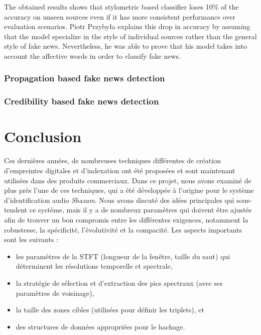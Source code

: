\documentclass[10pt, english]{report}
\begin{document}
The obtained results shows that stylometric based classifier loses 10\% of the accuracy on unseen sources even if it has more consistent performance over evaluation scenarios. Piotr Przybyła explains this drop in accuracy by assuming that the model specialize in the style of individual sources rather than the general style of fake news. Nevertheless, he was able to prove that his model takes into account the affective words in order to classify fake news.
\subsection{Propagation based fake news detection}

\subsection{Credibility based fake news detection}




\chapter{Conclusion}
Ces dernières années, de nombreuses techniques différentes de création d'empreintes digitales et d'indexation ont été proposées et sont maintenant utilisées dans des produits commerciaux. Dans ce projet, nous avons examiné de plus près l'une de ces techniques, qui a été développée à l'origine pour le système d'identification audio \textit{Shazam}. Nous avons discuté des idées principales qui sous-tendent ce système, mais il y a de nombreux paramètres qui doivent être ajustés afin de trouver un bon compromis entre les différentes exigences, notamment la robustesse, la spécificité, l'évolutivité et la compacité. Les aspects importants sont les suivants :\\

 \begin{itemize}
	\item les paramètres de la STFT (longueur de la fenêtre, taille du saut) qui déterminent les résolutions temporelle et spectrale,
	\item la stratégie de sélection et d'extraction des pics spectraux (avec ses paramètres de voisinage),
	\item la taille des zones cibles (utilisées pour définir les triplets), et
	\item des structures de données appropriées pour le hachage.
\end{itemize}
\end{document}
